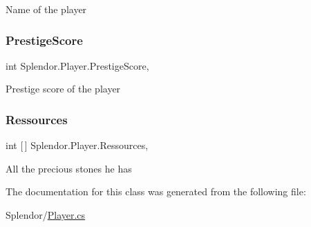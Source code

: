 Name of the player 

\mbox{\label{class_splendor_1_1_player_a25f353959c735ce45d643d6cf614b157}} 
\subsubsection{\texorpdfstring{Prestige\+Score}{PrestigeScore}}
{\footnotesize\ttfamily int Splendor.\+Player.\+Prestige\+Score\hspace{0.3cm}{\ttfamily [get]}, {\ttfamily [set]}}



Prestige score of the player 

\mbox{\label{class_splendor_1_1_player_a1c5ccd2470e3bbc84e9a156bc323bfd0}} 
\subsubsection{\texorpdfstring{Ressources}{Ressources}}
{\footnotesize\ttfamily int \mbox{[}$\,$\mbox{]} Splendor.\+Player.\+Ressources\hspace{0.3cm}{\ttfamily [get]}, {\ttfamily [set]}}



All the precious stones he has 



The documentation for this class was generated from the following file\+:\begin{DoxyCompactItemize}
\item 
Splendor/\hyperlink{_player_8cs}{Player.\+cs}\end{DoxyCompactItemize}
